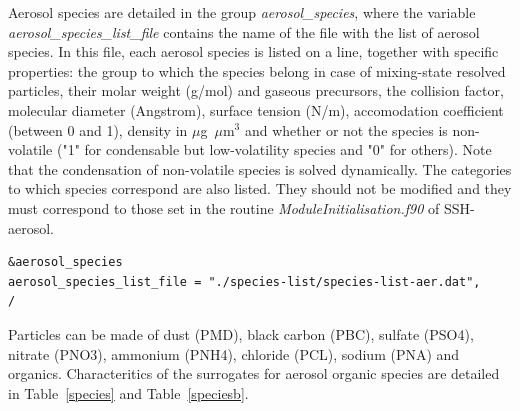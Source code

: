\documentclass[a4paper,11pt]{article}
\begin{document}
Aerosol species are detailed in the group {\textit{aerosol\_species}}, where the variable {\textit{aerosol\_species\_list\_file}} contains the name of the file with the list of aerosol species.
In this file, each aerosol species is listed on a line, together with specific properties: the group to which the species belong in case of mixing-state resolved particles, their molar weight (g/mol) and gaseous precursors, the collision factor, molecular diameter (Angstrom), surface tension (N/m), accomodation coefficient (between 0 and 1), density in $\mu$g~$\mu$m$^3$ and whether or not the species is non-volatile ("1" for condensable but low-volatility species and "0" for others).
Note that the condensation of non-volatile species is solved dynamically.
The categories to which species correspond are also listed. They should not be modified and they must correspond to those set in the routine {\textit{ModuleInitialisation.f90}} of SSH-aerosol.

\begin{verbatim}
&aerosol_species
aerosol_species_list_file = "./species-list/species-list-aer.dat",
/
\end{verbatim}

Particles can be made of dust (PMD), black carbon (PBC), sulfate (PSO4), nitrate (PNO3), ammonium (PNH4), chloride (PCL), sodium (PNA) and organics. Characteritics of the surrogates for aerosol organic species are detailed in Table~\ref{species} and Table~\ref{speciesb}.
\end{document}
